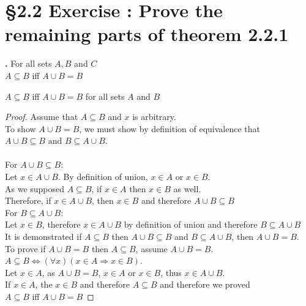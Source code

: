 \documentclass[a4paper,11pt]{article}
\begin{document}
\newpage

\setcounter{ProblemCounter}{7}
\setcounter{SubsectionCounter}{15}
\section*{\S 2.2 Exercise : Prove the remaining parts of theorem 2.2.1 }
\textbf{.}
For all sets \(A, B\) and \(C\)\\
\(A \subseteq B\) iff \(A \cup B = B\)
\begin{theorem5}
\(A \subseteq B\) iff \(A \cup B = B\) for all sets \(A\) and \(B\)
\begin{proof}
Assume that \(A \subseteq B\) and \(x\) is arbitrary.\\
To show \(A \cup B = B\), we must show by definition of equivalence that\\
\(A \cup B \subseteq B \text{ and } B \subseteq A \cup B\).\\\\
For \(A \cup B \subseteq B:\)\\
Let \(x \in A \cup B\). By definition of union, \(x \in A\) or \(x \in B\).\\
As we supposed \(A \subseteq B\), if \(x \in A\) then \(x \in B\) as well.\\
Therefore, if \(x \in A \cup B\), then \(x \in B\) and therefore \(A \cup B \subseteq 
B\)\\

\noindent For \(B \subseteq A \cup B:\)\\
Let \(x \in B\), therefore \(x \in A \cup B\) by definition of union and therefore \(B \subseteq A \cup B\)\\

\noindent It is demonstrated if \(A \subseteq B\) then \(A \cup B \subseteq B\)
and \(B \subseteq A \cup B\), then \(A \cup B = B\).\\
To prove if \(A \cup B = B\) then \(A \subseteq B\), assume \(A \cup B = B\).\\
\(A \subseteq B \Leftrightarrow (\forall x)(x \in A \Rightarrow x \in B)\).\\
Let \(x \in A\), as \(A \cup B = B\), \(x \in A\) or \(x \in B\), thus \(x \in A \cup 
B\).\\
If \(x \in A\), the \(x \in B\) and therefore \(A \subseteq B\) and therefore we 
proved\\ \(A \subseteq B\) iff \(A \cup B = B\)
\end{proof}
\end{theorem5}
\end{document}
